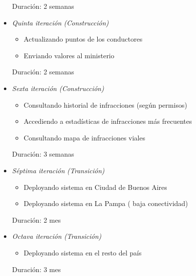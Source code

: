 \begin{itemize}
Duración: 2 semanas

\item \textit{Quinta iteración (Construcción)}
\begin{itemize}
\item Actualizando puntos de los conductores 
\item Enviando valores al ministerio 
\end{itemize}

Duración: 2 semanas

\item \textit{Sexta iteración (Construcción)}
\begin{itemize}
\item Consultando historial de infracciones (según permisos) 
\item Accediendo a estadísticas de infracciones más frecuentes 
\item Consultando mapa de infracciones viales 
\end{itemize}

Duración: 3 semanas

\item \textit{Séptima iteración (Transición)}
\begin{itemize}
\item Deployando sistema en Ciudad de Buenos Aires 
\item Deployando sistema en La Pampa ( baja conectividad) 
\end{itemize}

Duración: 2 mes

\item \textit{Octava iteración (Transición)}
\begin{itemize}
\item Deployando sistema en el resto del país
\end{itemize}

Duración: 3 mes

\end{itemize}